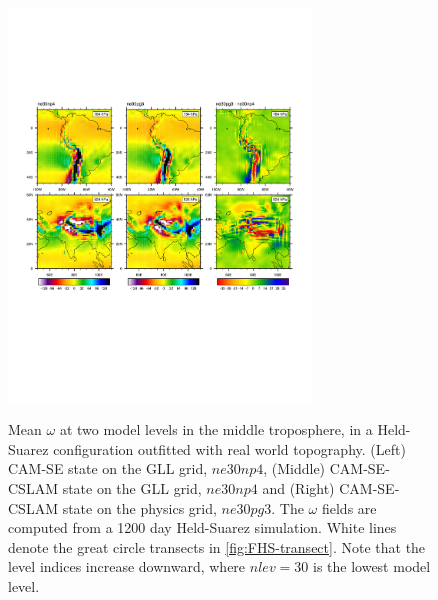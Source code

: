 \documentclass[twocol]{ametsoc}
\begin{document}
\begin{figure}[t]
\noindent\includegraphics[width=19pc,angle=0]{figs/FHS-contours-CROP.pdf}\\
\caption{Mean $\omega$ at two model levels in the middle troposphere, in a Held-Suarez configuration outfitted with real world topography. (Left) CAM-SE state on the GLL grid, $ne30np4$, (Middle) CAM-SE-CSLAM state on the GLL grid, $ne30np4$ and (Right) CAM-SE-CSLAM state on the physics grid, $ne30pg3$. The $\omega$ fields are computed from a 1200 day Held-Suarez simulation. White lines denote the great circle transects in \ref{fig:FHS-transect}. Note that the level indices increase downward, where $nlev=30$ is the lowest model level.}
\label{fig:FHS-contours}
\end{figure}


\end{document}
